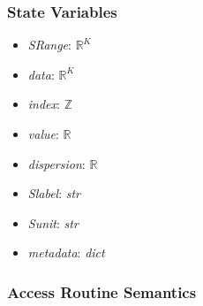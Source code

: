 \documentclass[12pt, titlepage]{article}
\begin{document}
\subsubsection{State Variables}
\begin{itemize}
    \item \textit{SRange}: $\mathbb{R}^K$
    \item \textit{data}: $\mathbb{R}^K$
    \item \textit{index}: $\mathbb{Z}$
    \item \textit{value}: $\mathbb{R}$
    \item \textit{dispersion}: $\mathbb{R}$
    \item \textit{Slabel}: \textit{str}
    \item \textit{Sunit}: \textit{str}
    \item \textit{metadata}: \textit{dict}
\end{itemize}

\subsubsection{Access Routine Semantics}
\end{document}

